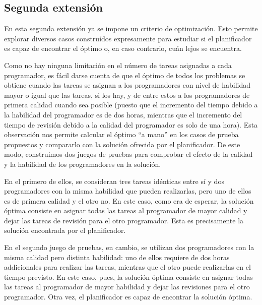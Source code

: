 
\subsection{Segunda extensión} \label{sec:res-ext2}

En esta segunda extensión ya se impone un criterio de optimización. Esto 
permite explorar diversos casos construídos expresamente para estudiar si 
el planificador es capaz de encontrar el óptimo o, en caso contrario, cuán 
lejos se encuentra. 

Como no hay ninguna limitación en el número de tareas asignadas a cada 
programador, es fácil darse cuenta de que el óptimo de todos los problemas se 
obtiene cuando las tareas se asignan a los programadores con nivel de 
habilidad mayor o igual que las tareas, si los hay, y de entre estos a los 
programadores de primera calidad cuando sea posible (puesto que el incremento 
del tiempo debido a la habilidad del programador es de dos horas, mientras 
que el incremento del tiempo de revisión debido a la calidad del programador 
es solo de una hora). Esta observación nos permite calcular el óptimo 
``a mano'' en los casos de prueba propuestos y compararlo con la solución 
ofrecida por el planificador. De este modo, construimos dos juegos de 
pruebas para comprobar el efecto de la calidad y la habilidad de los 
programadores en la solución.

En el primero de ellos, se consideran tres tareas idénticas entre sí y dos 
programadores con la misma habilidad que pueden realizarlas, pero uno de 
ellos es de primera calidad y el otro no. En este caso, como era de esperar, 
la solución óptima consiste en asignar todas las tareas al programador de 
mayor calidad y dejar las tareas de revisión para el otro programador. Esta 
es precisamente la solución encontrada por el planificador.

En el segundo juego de pruebas, en cambio, se utilizan dos programadores con 
la misma calidad pero distinta habilidad: uno de ellos requiere de dos horas 
addicionales para realizar las tareas, mientras que el otro puede realizarlas 
en el tiempo previsto. En este caso, pues, la solución óptima consiste en 
asignar todas las tareas al programador de mayor habilidad y dejar las 
revisiones para el otro programador. Otra vez, el planificador es capaz de 
encontrar la solución óptima.




